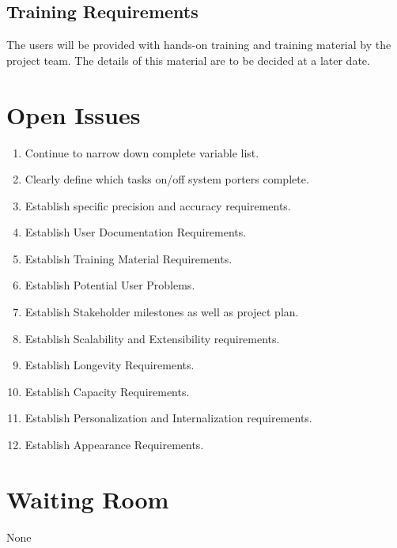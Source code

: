\documentclass[paper=letter, fontsize=10pt]{scrartcl}
\numberwithin{equation}{section}		%
\numberwithin{figure}{section}			%
\numberwithin{table}{section}				%
\begin{document}
\subsection{Training Requirements}
The users will be provided with hands-on training and training material by the project team. The details of this material are to be decided at a later date. 

\section{Open Issues}
\begin{enumerate}
	\item Continue to narrow down complete variable list.
	\item Clearly define which tasks on/off system porters complete.
	\item Establish specific precision and accuracy requirements.
	\item Establish User Documentation Requirements.
	\item Establish Training Material Requirements.
	\item Establish Potential User Problems.
	\item Establish Stakeholder milestones as well as project plan.
	\item Establish Scalability and Extensibility requirements.
	\item Establish Longevity Requirements.
	\item Establish Capacity Requirements.
	\item Establish Personalization and Internalization requirements.
	\item Establish Appearance Requirements.
\end{enumerate}

\section{Waiting Room}
None

\end{document}
